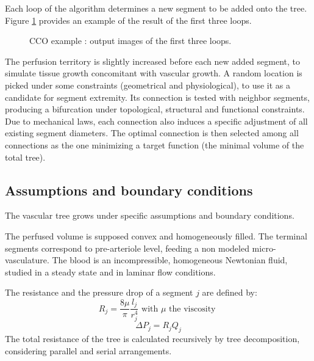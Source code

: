 \documentclass[a4paper, 11pt]{article} %
\begin{document}
Each loop of the algorithm determines a new segment to be added onto the tree. Figure \ref{fig:algo illustr} provides an example of the result of the first three loops.
\begin{figure}[htbp]
\centering
{}
\caption{CCO example : output images of the first three loops.}
\label{fig:algo illustr}
\end{figure}
The perfusion territory is slightly increased before each new added segment, to simulate tissue growth concomitant with vascular growth.
A  random location is picked under some constraints (geometrical and physiological), to use it as a candidate for segment extremity. Its connection is tested with neighbor segments, producing a bifurcation under topological, structural and functional constraints.
Due to mechanical laws, each connection also induces a specific adjustment of all existing segment diameters. The optimal connection is then selected among all connections as the one minimizing a target function (the minimal volume of the total tree).




\subsection{Assumptions and boundary conditions}
The vascular tree grows under specific assumptions and boundary conditions.

The perfused volume is supposed convex and homogeneously filled. The terminal segments correspond to pre-arteriole level, feeding a non modeled micro-vasculature.
The blood is an incompressible, homogeneous Newtonian fluid, studied in a steady state and in laminar flow conditions. 

The resistance and the pressure drop of a segment $j$ are defined by:
\begin{equation}\label{resistance}
R_j = \frac{8\mu}{\pi}\frac{l_j}{r_j^4} \text{ with } \mu \text{ the viscosity }
\end{equation}
\begin{equation}\label{Pdrop}
\Delta P_j = R_j Q_j
\end{equation}
The total resistance of the tree is calculated recursively by tree decomposition, considering parallel and serial arrangements.
\end{document}
